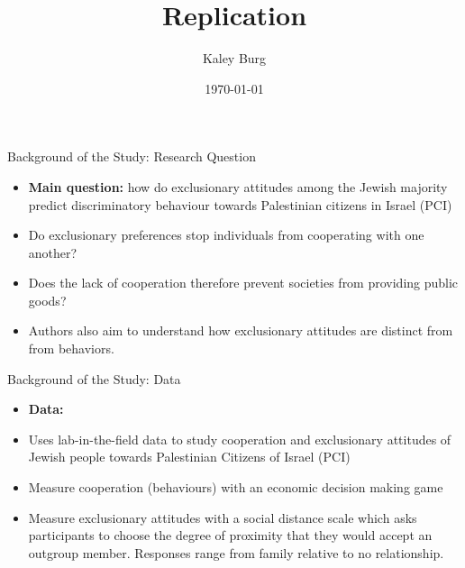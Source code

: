 \documentclass{beamer}
\title[Replication]{Replication} %
\author{Kaley Burg} %
\institute{Applied Statistics II} %
\date{\today} %
\begin{document}
\begin{frame}[plain]
    \maketitle
\end{frame}

\begin{frame}{Background of the Study: Research Question}
   \begin{itemize}
   	\item \textbf{Main question:} how do exclusionary attitudes among the Jewish majority predict discriminatory behaviour towards Palestinian citizens in Israel (PCI)
   	\item Do exclusionary preferences stop individuals from cooperating with one another?
   	\item Does the lack of cooperation therefore prevent societies from providing public goods?
   	\item Authors also aim to understand how exclusionary attitudes are distinct from from behaviors.
   \end{itemize}
\end{frame}

\begin{frame}{Background of the Study: Data}
	\begin{itemize}
		\item \textbf{Data:}
		\item Uses lab-in-the-field data to study cooperation and exclusionary attitudes of Jewish people towards Palestinian Citizens of Israel (PCI)
		\item Measure cooperation (behaviours) with an economic decision making game
		\item Measure exclusionary attitudes with a social distance scale which asks participants to choose the degree of proximity that they would accept an outgroup member. Responses range from family relative to no relationship.

	\end{itemize}
\end{frame}
\end{document}
